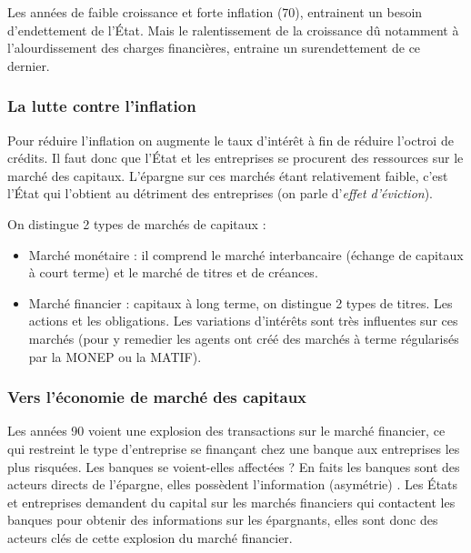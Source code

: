 Les années de faible croissance et forte inflation (70), entrainent un besoin d'endettement de l'État. Mais le ralentissement de la croissance dû notamment à 
l'alourdissement des charges financières, entraine un surendettement de ce dernier.

\subsubsection{La lutte contre l'inflation} %
\label{sub:la_lutte_contre_l_inflation}

Pour réduire l'inflation on augmente le taux d'intérêt à fin de réduire l'octroi de crédits. Il faut donc que l'État et les entreprises se procurent des 
ressources sur le marché des capitaux. L'épargne sur ces marchés étant relativement faible, c'est l'État qui l'obtient au détriment des entreprises (on parle
d'\emph{effet d'éviction}).

On distingue 2 types de marchés de capitaux : 
\begin{itemize}[label=]
	\item Marché monétaire : il comprend le marché interbancaire (échange de capitaux à court terme) et le marché de titres et de créances.
	\item Marché financier : capitaux à long terme, on distingue 2 types de titres. Les actions et les obligations. Les variations d'intérêts sont très influentes sur ces marchés (pour y remedier les agents ont créé des marchés à terme régularisés par la MONEP ou la MATIF).
\end{itemize}


\subsubsection{Vers l'économie de marché des capitaux} %
\label{sub:vers_l_economie_de_marche_des_capitaux}

Les années 90 voient une explosion des transactions sur le marché financier, ce qui restreint le type d'entreprise se finançant chez une banque aux entreprises
les plus risquées. Les banques se voient-elles affectées ? En faits les banques sont des acteurs directs de l'épargne, elles possèdent l'information (asymétrie)
. Les États et entreprises demandent du capital sur les marchés financiers qui contactent les banques pour obtenir des informations sur les épargnants, elles 
sont donc des acteurs clés de cette explosion du marché financier.

